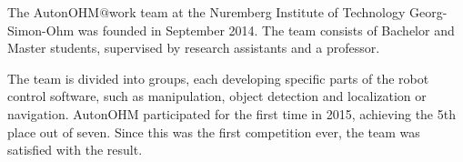The AutonOHM$@$work team at the Nuremberg Institute of Technology Georg-Simon-Ohm
was founded in September 2014. The team consists of Bachelor and Master students, supervised by research assistants and a professor. 

The team is divided into groups, each developing specific parts of the robot control software, such as manipulation,
object detection and localization or navigation.
AutonOHM participated for the first time in 2015, achieving the 5th place out of seven. Since this was the first competition ever, the team was satisfied with the result.
